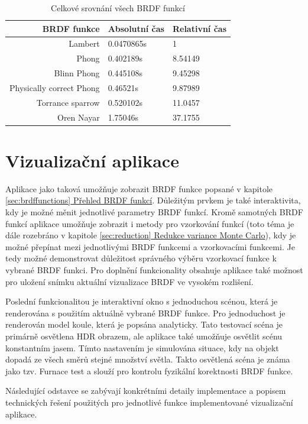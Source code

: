 \documentclass[czech,master]{diploma}
\begin{document}
\begin{table}[ht]
  \centering
  \begin{tabular}{r|ll}
    BRDF funkce              & Absolutní čas & Relativní čas \\
    \hline
    Lambert                  & 0.0470865s    & 1             \\
    Phong                    & 0.402189s     & 8.54149       \\
    Blinn Phong              & 0.445108s     & 9.45298       \\
    Physically correct Phong & 0.46521s      & 9.87989       \\
    Torrance sparrow         & 0.520102s     & 11.0457       \\
    Oren Nayar               & 1.75046s      & 37.1755
  \end{tabular}
  \caption{Celkové srovnání všech BRDF funkcí}
  \label{tab:AllBRDFsComparison}
\end{table}




\clearpage
\chapter{Vizualizační aplikace}
Aplikace jako taková umožňuje zobrazit BRDF funkce popsané v kapitole \hyperref[sec:brdffunctions]{\ref{sec:brdffunctions} Přehled BRDF funkcí}. Důležitým prvkem je také interaktivita, kdy je možné měnit jednotlivé parametry BRDF funkcí. Kromě samotných BRDF funkcí aplikace umožňuje zobrazit i metody pro vzorkování funkcí (toto téma je dále rozebráno v kapitole \hyperref[sec:reduction]{\ref{sec:reduction} Redukce variance Monte Carlo}), kdy je možné přepínat mezi jednotlivými BRDF funkcemi a vzorkovacími funkcemi. Je tedy možné demonstrovat důležitost správného výběru vzorkovací funkce k vybrané BRDF funkci. Pro doplnění funkcionality obsahuje aplikace také možnost pro uložení snímku aktuální vizualizace BRDF ve vysokém rozlišení. \par
Poslední funkcionalitou je interaktivní okno s jednoduchou scénou, která je renderována s použitím aktuálně vybrané BRDF funkce. Pro jednoduchost je renderován model koule, která je popsána analyticky. Tato testovací scéna je primárně osvětlena HDR obrazem, ale aplikace také umožňuje osvětlit scénu konstantním jasem. Tímto nastavením je simulována situace, kdy na objekt dopadá ze všech směrů stejné množství světla. Takto osvětlená scéna je známa jako tzv. Furnace test a slouží pro kontrolu fyzikální korektnosti BRDF funkce.\par
Následující odstavce se zabývají konkrétními detaily implementace a popisem technických řešení použitých pro jednotlivé funkce implementované vizualizační aplikace.
\end{document}
